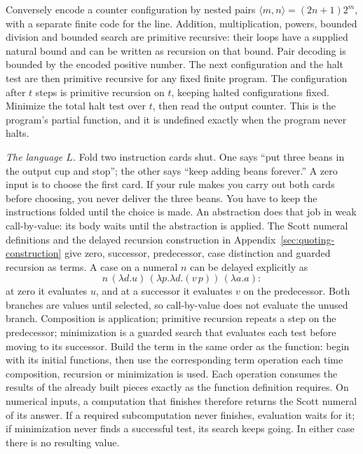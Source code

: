 \documentclass[11pt,twoside]{article}
\theoremstyle{thielethm}
\theoremstyle{thieledef}
\theoremstyle{thieledef}
\theoremstyle{thieledef}
\theoremstyle{thielethm}
\theoremstyle{thieleobs}
\theoremstyle{thielethm}
\begin{document}
Conversely encode a counter configuration by nested pairs
$\langle m,n\rangle=(2n+1)2^m$, with a separate finite code for the line.
Addition, multiplication, powers, bounded division and bounded search are primitive
recursive: their loops have a supplied natural bound and can be written as recursion
on that bound. Pair decoding is bounded by the encoded positive number. The next
configuration and the halt test are then primitive recursive for any fixed finite
program. The configuration after $t$ steps is primitive recursion on $t$, keeping halted
configurations fixed. Minimize the total halt test over $t$, then read the output counter.
This is the program's partial function, and it is undefined exactly when the program
never halts.

\emph{The language $L$.} Fold two instruction cards shut. One says ``put three beans
in the output cup and stop''; the other says ``keep adding beans forever.'' A zero
input is to choose the first card. If your rule makes you carry out both cards
before choosing, you never deliver the three beans. You have to keep the
instructions folded until the choice is made. An abstraction does that job in
weak call-by-value: its body waits until the abstraction is applied.
The Scott numeral definitions and the delayed recursion
construction in Appendix~\ref{sec:quoting-construction} give zero, successor, predecessor,
case distinction and guarded recursion as terms. A case on a numeral $n$ can be delayed
explicitly as
\[
n\,(\lambda d.u)\,(\lambda p.\lambda d.(v\,p))\,(\lambda a.a):
\]
at zero it evaluates $u$, and at a successor it evaluates $v$ on the predecessor.
Both branches are values until selected, so call-by-value does not evaluate the unused
branch. Composition is application; primitive recursion repeats a step on the predecessor;
minimization is a guarded search that evaluates each test before moving to its successor.
Build the term in the same order as the function: begin with its initial
functions, then use the corresponding term operation each time composition,
recursion or minimization is used. Each operation consumes the results of the
already built pieces exactly as the function definition requires. On numerical
inputs, a computation that finishes therefore returns the Scott numeral of its
answer. If a required subcomputation never finishes, evaluation waits for it;
if minimization never finds a successful test, its search keeps going. In either
case there is no resulting value.
\end{document}

